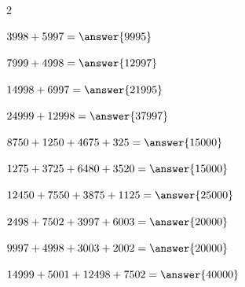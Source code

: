 \documentclass{ximera}
\begin{document}
\begin{oefening}{\oefG}
\begin{multicols}{2}
        \begin{question}
        \(3998+5997=\answer{9995}\)
        \end{question}
        
        \begin{question}
        \(7999+4998=\answer{12997}\)
        \end{question}
        
        \begin{question}
        \(14998+6997=\answer{21995}\)
        \end{question}
        
        \begin{question}
        \(24999+12998=\answer{37997}\)
        \end{question}
        
        \begin{question}
        \(8750+1250+4675+325=\answer{15000}\)
        \end{question}
        
        \begin{question}
        \(1275+3725+6480+3520=\answer{15000}\)
        \end{question}
        
        \begin{question}
        \(12450+7550+3875+1125=\answer{25000}\)
        \end{question}
        
        \begin{question}
        \(2498+7502+3997+6003=\answer{20000}\)
        \end{question}
        
        \begin{question}
        \(9997+4998+3003+2002=\answer{20000}\)
        \end{question}
        
        \begin{question}
        \(14999+5001+12498+7502=\answer{40000}\)
        \end{question}
        
        \end{multicols}
        
        \end{oefening}

\end{document}
